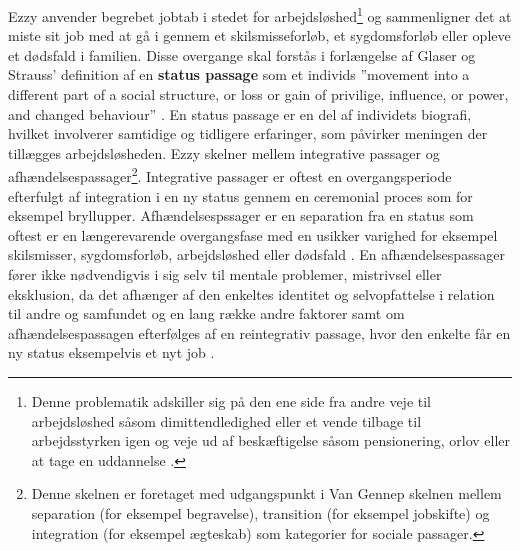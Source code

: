 Ezzy anvender begrebet jobtab i stedet for arbejdsløshed\footnote{Denne problematik adskiller sig på den ene side fra andre veje til arbejdsløshed såsom dimittendledighed eller et vende tilbage til arbejdsstyrken igen og veje ud af beskæftigelse såsom pensionering, orlov eller at tage en uddannelse \parencite[48]{Ezzy1993}.} og sammenligner det at miste sit job med at gå i gennem et skilsmisseforløb, et sygdomsforløb eller opleve et dødsfald i familien. Disse overgange skal forstås i forlængelse af Glaser og Strauss' definition af en \textbf{status passage} som et individs ”movement into a different part of a social structure, or loss or gain of privilige, influence, or power, and changed behaviour” \parencite[48]{Ezzy1993}. En status passage er en del af individets biografi, hvilket involverer samtidige og tidligere erfaringer, som påvirker meningen der tillægges arbejdsløsheden. Ezzy skelner mellem integrative passager og afhændelsespassager\footnote{Denne skelnen er foretaget med udgangspunkt i Van Gennep skelnen mellem separation (for eksempel begravelse), transition (for eksempel jobskifte) og integration (for eksempel ægteskab) som kategorier for sociale passager\parencite[48]{Ezzy1993}.}. Integrative passager er oftest en overgangsperiode efterfulgt af integration i en ny status gennem en ceremonial proces som for eksempel bryllupper. Afhændelsespssager er en separation fra en status som oftest er en længerevarende overgangsfase med en usikker varighed for eksempel skilsmisser, sygdomsforløb, arbejdsløshed eller dødsfald \parencite[49]{Ezzy1993}. En afhændelsespassager fører ikke nødvendigvis i sig selv til mentale problemer, mistrivsel eller eksklusion, da det afhænger af den enkeltes identitet og selvopfattelse i relation til andre og samfundet og en lang række andre faktorer samt om afhændelsespassagen efterfølges af en reintegrativ passage, hvor den enkelte får en ny status eksempelvis et nyt job \parencite[32]{Noerup2014}. %

